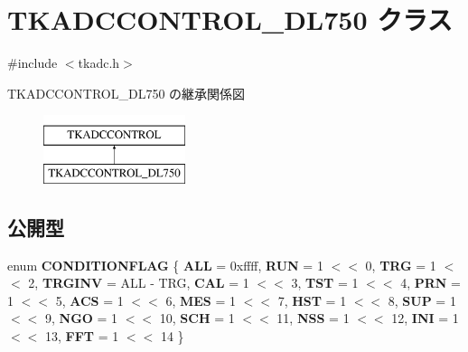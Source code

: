 \hypertarget{class_t_k_a_d_c_c_o_n_t_r_o_l___d_l750}{}\section{T\+K\+A\+D\+C\+C\+O\+N\+T\+R\+O\+L\+\_\+\+D\+L750 クラス}
\label{class_t_k_a_d_c_c_o_n_t_r_o_l___d_l750}


{\ttfamily \#include $<$tkadc.\+h$>$}

T\+K\+A\+D\+C\+C\+O\+N\+T\+R\+O\+L\+\_\+\+D\+L750 の継承関係図\begin{figure}[H]
\begin{center}
\leavevmode
\includegraphics[height=2.000000cm]{class_t_k_a_d_c_c_o_n_t_r_o_l___d_l750}
\end{center}
\end{figure}
\subsection*{公開型}
\begin{DoxyCompactItemize}
\item 
\mbox{\label{class_t_k_a_d_c_c_o_n_t_r_o_l___d_l750_a3d102b40e87ea05ca2676ba29ac7fcd3}} 
enum {\bfseries C\+O\+N\+D\+I\+T\+I\+O\+N\+F\+L\+AG} \{ \newline
{\bfseries A\+LL} = 0xffff, 
{\bfseries R\+UN} = 1 $<$$<$ 0, 
{\bfseries T\+RG} = 1 $<$$<$ 2, 
{\bfseries T\+R\+G\+I\+NV} = A\+LL -\/ T\+RG, 
\newline
{\bfseries C\+AL} = 1 $<$$<$ 3, 
{\bfseries T\+ST} = 1 $<$$<$ 4, 
{\bfseries P\+RN} = 1 $<$$<$ 5, 
{\bfseries A\+CS} = 1 $<$$<$ 6, 
\newline
{\bfseries M\+ES} = 1 $<$$<$ 7, 
{\bfseries H\+ST} = 1 $<$$<$ 8, 
{\bfseries S\+UP} = 1 $<$$<$ 9, 
{\bfseries N\+GO} = 1 $<$$<$ 10, 
\newline
{\bfseries S\+CH} = 1 $<$$<$ 11, 
{\bfseries N\+SS} = 1 $<$$<$ 12, 
{\bfseries I\+NI} = 1 $<$$<$ 13, 
{\bfseries F\+FT} = 1 $<$$<$ 14
 \}
\end{DoxyCompactItemize}
